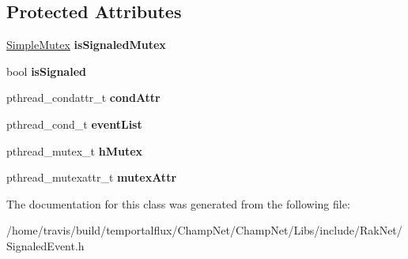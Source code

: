 \subsection*{Protected Attributes}
\begin{DoxyCompactItemize}
\item 
\hypertarget{class_rak_net_1_1_signaled_event_a3f282e90b2cee3c61452ba42a718b6b6}{\hyperlink{class_rak_net_1_1_simple_mutex}{Simple\-Mutex} {\bfseries is\-Signaled\-Mutex}}\label{class_rak_net_1_1_signaled_event_a3f282e90b2cee3c61452ba42a718b6b6}

\item 
\hypertarget{class_rak_net_1_1_signaled_event_a27e4a3c222aced833caf092f29e98974}{bool {\bfseries is\-Signaled}}\label{class_rak_net_1_1_signaled_event_a27e4a3c222aced833caf092f29e98974}

\item 
\hypertarget{class_rak_net_1_1_signaled_event_afdc2cd495cfa5231a40a2ceef3018e9b}{pthread\-\_\-condattr\-\_\-t {\bfseries cond\-Attr}}\label{class_rak_net_1_1_signaled_event_afdc2cd495cfa5231a40a2ceef3018e9b}

\item 
\hypertarget{class_rak_net_1_1_signaled_event_a9a10665b9c8a27d00d7610d4a0552b5d}{pthread\-\_\-cond\-\_\-t {\bfseries event\-List}}\label{class_rak_net_1_1_signaled_event_a9a10665b9c8a27d00d7610d4a0552b5d}

\item 
\hypertarget{class_rak_net_1_1_signaled_event_a5657a3fdb06ea1ba14f81596854f6008}{pthread\-\_\-mutex\-\_\-t {\bfseries h\-Mutex}}\label{class_rak_net_1_1_signaled_event_a5657a3fdb06ea1ba14f81596854f6008}

\item 
\hypertarget{class_rak_net_1_1_signaled_event_a256838909ba8dfb9d01b68303f07d529}{pthread\-\_\-mutexattr\-\_\-t {\bfseries mutex\-Attr}}\label{class_rak_net_1_1_signaled_event_a256838909ba8dfb9d01b68303f07d529}

\end{DoxyCompactItemize}


The documentation for this class was generated from the following file\-:\begin{DoxyCompactItemize}
\item 
/home/travis/build/temportalflux/\-Champ\-Net/\-Champ\-Net/\-Libs/include/\-Rak\-Net/Signaled\-Event.\-h\end{DoxyCompactItemize}
